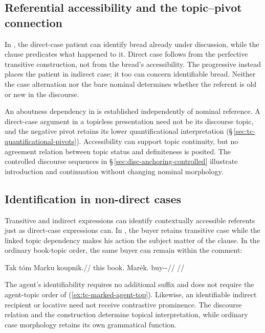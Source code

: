 \subsection{Referential accessibility and the topic--pivot connection}
\label{sec:nm-topic-abs}\label{sec:nm-topic-interface}

In , the direct-case patient can identify bread
 already under discussion, while the clause predicates what happened to it.
 Direct case follows from the perfective transitive construction, not from
 the bread's accessibility. The progressive 
 instead places the patient in indirect case; it too can concern identifiable
 bread. Neither the case alternation nor the bare nominal determines whether
 the referent is old or new in the discourse.

An aboutness dependency in  is established independently of
 nominal reference. A direct-case argument in a topicless presentation need
 not be its discourse topic, and the negative pivot  retains its
 lower quantificational interpretation (§\,\ref{sec:tc-quantificational-pivots}).
 Accessibility can support topic continuity, but no agreement relation
 between topic status and definiteness is posited. The controlled discourse
 sequences in §\,\ref{sec:disc-anchoring-controlled} illustrate introduction
 and continuation without changing nominal morphology.

\subsection{Identification in non-direct cases}
\label{sec:nm-topic-oblique}

Transitive and indirect expressions can identify contextually accessible
 referents just as direct-case expressions can. In ,
 the buyer retains transitive case while the linked topic dependency makes
 his action the subject matter of the clause. In the ordinary book-topic
 order, the same buyer can remain within the comment:

\ex\label{ex:tc-nondirect-anchoring}%
\begingl
\gla Tak tóm Marku koupnik.//
\glb this book.\Dir{} Marėk.\Trs{} buy-\Trs{}-\Pf{}//
\glft {}
//
\endgl
\xe

\noindent The agent's identifiability requires no additional suffix and
 does not require the agent-topic order of (\ref{ex:tc-marked-agent-top}).
 Likewise, an identifiable indirect recipient or locative need not receive
 contrastive prominence. The discourse relation and the construction determine
 topical interpretation, while ordinary case morphology retains its own
 grammatical function.

